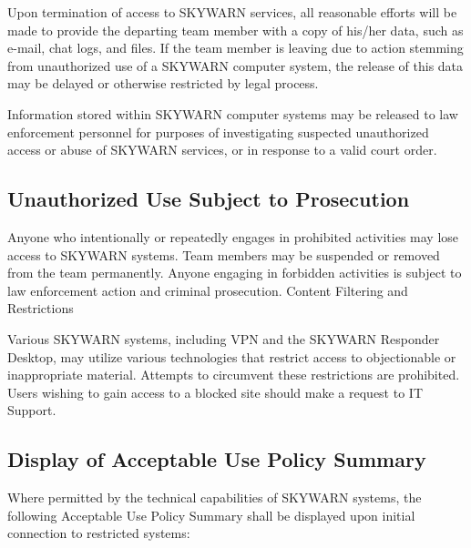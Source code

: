 \documentclass[pdflatex,letterpaper,twoside,12pt]{book}
\begin{document}
Upon termination of access to SKYWARN services, all reasonable efforts will be made to provide the departing team member with a copy of his/her data, such as e-mail, chat logs, and files.  If the team member is leaving due to action stemming from unauthorized use of a SKYWARN computer system, the release of this data may be delayed or otherwise restricted by legal process.

Information stored within SKYWARN computer systems may be released to law enforcement personnel for purposes of investigating suspected unauthorized access or abuse of SKYWARN services, or in response to a valid court order.

\subsection{Unauthorized Use Subject to Prosecution}

Anyone who intentionally or repeatedly engages in prohibited activities may lose access to SKYWARN systems.  Team members may be suspended or removed from the team permanently.  Anyone engaging in forbidden activities is subject to law enforcement action and criminal prosecution.
Content Filtering and Restrictions

Various SKYWARN systems, including VPN and the SKYWARN Responder Desktop, may utilize various technologies that restrict access to objectionable or inappropriate material.  Attempts to circumvent these restrictions are prohibited.  Users wishing to gain access to a blocked site should make a request to IT Support.

\subsection{Display of Acceptable Use Policy Summary}

Where permitted by the technical capabilities of SKYWARN systems, the following Acceptable Use Policy Summary shall be displayed upon initial connection to restricted systems:
\end{document}
